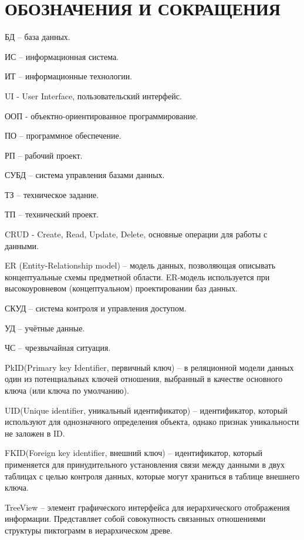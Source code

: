 \section*{ОБОЗНАЧЕНИЯ И СОКРАЩЕНИЯ}

БД -- база данных.

ИС -- информационная система.

ИТ -- информационные технологии. 

UI - User Interface, пользовательский интерфейс.

ООП - объектно-ориентированное программирование.

ПО -- программное обеспечение.

РП -- рабочий проект.

СУБД -- система управления базами данных.

ТЗ -- техническое задание.

ТП -- технический проект.

CRUD - Create, Read, Update, Delete, основные операции для работы с данными.

ER (Entity-Relationship model) -- модель данных, позволяющая описывать концептуальные схемы предметной области. ER-модель используется при высокоуровневом (концептуальном) проектировании баз данных.

СКУД -- система контроля и управления доступом.

УД -- учётные данные.

ЧС -- чрезвычайная ситуация.

PkID(Primary key Identifier, первичный ключ) -- в реляционной модели данных один из потенциальных ключей отношения, выбранный в качестве основного ключа (или ключа по умолчанию).

UID(Unique identifier, уникальный идентификатор) -- идентификатор, который используют для однозначного определения объекта, однако признак уникальности не заложен в ID.

FKID(Foreign key identifier, внешний ключ) -- идентификатор, который применяется для принудительного установления связи между данными в двух таблицах с целью контроля данных, которые могут храниться в таблице внешнего ключа.

TreeView -- элемент графического интерфейса для иерархического отображения информации. Представляет собой совокупность связанных отношениями структуры пиктограмм в иерархическом древе.